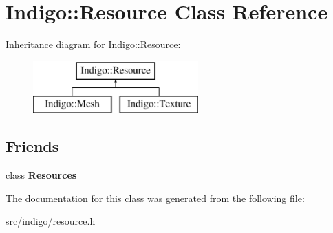 \hypertarget{class_indigo_1_1_resource}{}\section{Indigo\+:\+:Resource Class Reference}
\label{class_indigo_1_1_resource}
Inheritance diagram for Indigo\+:\+:Resource\+:\begin{figure}[H]
\begin{center}
\leavevmode
\includegraphics[height=2.000000cm]{class_indigo_1_1_resource}
\end{center}
\end{figure}
\subsection*{Friends}
\begin{DoxyCompactItemize}
\item 
\mbox{\label{class_indigo_1_1_resource_a74b3f77e4a7285c624d30192f9643876}} 
class {\bfseries Resources}
\end{DoxyCompactItemize}


The documentation for this class was generated from the following file\+:\begin{DoxyCompactItemize}
\item 
src/indigo/resource.\+h\end{DoxyCompactItemize}
